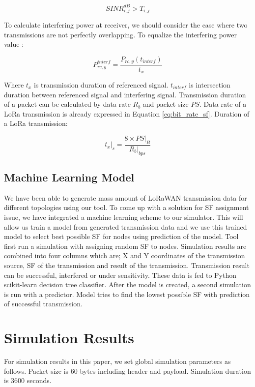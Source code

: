 \documentclass[conference]{IEEEtran}
\begin{document}
\begin{equation} \label{eq:sinr_t}
SINR_{i,j}^{dB} > T_{i,j}
\end{equation}

\par To calculate interfering power at receiver, we should consider the case where two transmissions are not perfectly overlapping. To equalize the interfering power value \cite{7996384}:

\begin{equation} \label{eq:p_interference}
P_{rc,y}^{interf} = \dfrac{P_{rc,y}(t_{interf})}{t_{x}}
\end{equation}

\par Where $t_{x}$ is transmission duration of referenced signal. $t_{interf}$ is intersection duration between referenced signal and interfering signal. Transmission duration of a packet can be calculated by data rate $R_{b}$ and packet size $PS$. Data rate of a LoRa transmission is already expressed in Equation \ref{eq:bit_rate_sf}. Duration of a LoRa transmission:

\begin{equation} \label{eq:transmission_duration}
t_{x}|_{s} = \dfrac{8 \times PS|_{B}}{R_{b}|_{bps}}
\end{equation}

\subsection{Machine Learning Model}
\par We have been able to generate mass amount of LoRaWAN transmission data for different topologies using our  tool. To come up with a solution for SF assignment issue, we have integrated a machine learning scheme to our simulator. This will allow us train a model from generated transmission data and we use this trained model to select best possible SF for nodes using prediction of the model. Tool first run a simulation with assigning random SF to nodes. Simulation results are combined into four columns which are; X and Y coordinates of the transmission source, SF of the transmission and result of the transmission. Transmission result can be successful, interfered or under sensitivity. These data is fed to Python scikit-learn decision tree classifier. After the model is created, a second simulation is run with a predictor. Model tries to find the lowest possible SF with prediction of successful transmission. 


\section{Simulation Results}  \label{Simulation Results}
\par For simulation results in this paper, we set global simulation parameters as follows. Packet size is 60 bytes including header and payload. Simulation duration is 3600 seconds.
\end{document}
